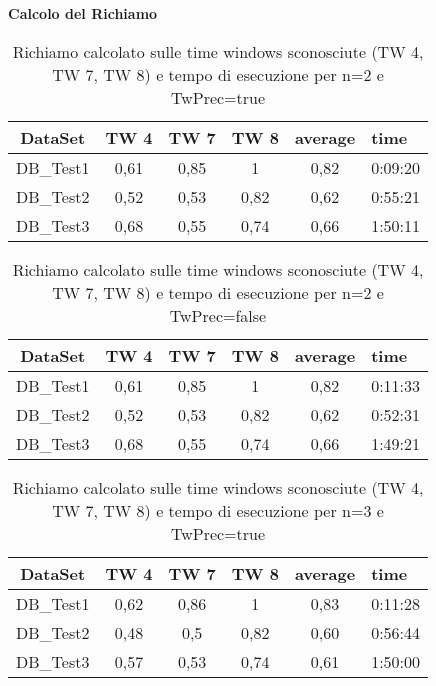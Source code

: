 \textbf{Calcolo del Richiamo}
\begin{table}[H]
	\centering
	\footnotesize
	\begin{tabular}{|cccccp{}|}
	\hline
	\textbf{DataSet} & \textbf{TW 4} & \textbf{ TW 7} & \textbf{TW 8} & \textbf{average} & \textbf{time}\\
	\hline 
	DB\_Test1 & 0,61 & 0,85 & 1 & 0,82 & 0:09:20\\ 
	DB\_Test2 & 0,52 & 0,53 & 0,82 & 0,62 & 0:55:21\\ 
	DB\_Test3 & 0,68 & 0,55 & 0,74 & 0,66 & 1:50:11\\ 
	\hline 
	\end{tabular}
	\caption{Richiamo calcolato sulle time windows sconosciute (TW 4, TW 7, TW 8) e tempo di esecuzione per n=2 e TwPrec=true}
\end{table}
\begin{table}[H]
	\centering
	\footnotesize
	\begin{tabular}{|cccccp{}|}
	\hline
	\textbf{DataSet} & \textbf{TW 4} & \textbf{ TW 7} & \textbf{TW 8} & \textbf{average} & \textbf{time}\\
	\hline 
	DB\_Test1 & 0,61 & 0,85 & 1 & 0,82 & 0:11:33\\ 
	DB\_Test2 & 0,52 & 0,53 & 0,82 & 0,62 & 0:52:31\\ 
	DB\_Test3 & 0,68 & 0,55 & 0,74 & 0,66 & 1:49:21\\  
	\hline 
	\end{tabular}
	\caption{Richiamo calcolato  sulle time windows sconosciute (TW 4, TW 7, TW 8) e tempo di esecuzione per n=2 e TwPrec=false}
\end{table}

\begin{table}[H]
	\centering
	\footnotesize
	\begin{tabular}{|cccccp{}|}
	\hline
	\textbf{DataSet} & \textbf{TW 4} & \textbf{ TW 7} & \textbf{TW 8} & \textbf{average} & \textbf{time}\\
	\hline 
	DB\_Test1 & 0,62 & 0,86 & 1 & 0,83 & 0:11:28\\ 
	DB\_Test2 & 0,48 & 0,5 & 0,82 & 0,60 & 0:56:44\\ 
	DB\_Test3 & 0,57 & 0,53 & 0,74 & 0,61 & 1:50:00\\  
	\hline 
	\end{tabular}
	\caption{Richiamo calcolato  sulle time windows sconosciute (TW 4, TW 7, TW 8) e tempo di esecuzione per n=3 e TwPrec=true}
\end{table}

